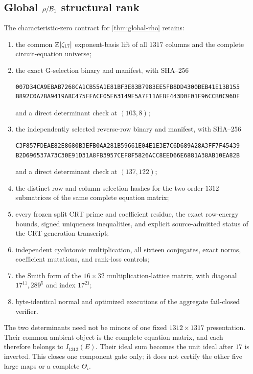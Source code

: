 \subsection{Global \texorpdfstring{\(\rho/\mathcal B_1\)}{rho/B1} structural rank}

The characteristic-zero contract for \cref{thm:global-rho} retains:
\begin{enumerate}
  \item the common \(\mathbb Z[\zeta_{17}]\) exponent-basis lift of all
  \(1317\) columns and the complete circuit-equation universe;
  \item the exact G-selection binary and manifest, with SHA--256
  \begin{verbatim}
007D34CA9EBAB7268CA1CB55A1E81BF3E83B7983EE5FB8DD4300BEB41E13B155
B892C0A7BA9419A8C475FFACF05E63149E5A7F11AEBF443D0F01E96CCB0C96DF
  \end{verbatim}
  and a direct determinant check at \((103,8)\);
  \item the independently selected reverse-row binary and manifest, with
  SHA--256
  \begin{verbatim}
C3F857FDEAE82E8680B3EFB0AA281B59661E04E1E3E7C6D689A28A3FF7F45439
B2D696537A73C30E91D31A8FB3957CEF8F5826ACC8EED66E6881A38AB10EA82B
  \end{verbatim}
  and a direct determinant check at \((137,122)\);
  \item the distinct row and column selection hashes for the two
  order-\(1312\) submatrices of the same complete equation matrix;
  \item every frozen split CRT prime and coefficient residue, the exact
  row-energy bounds, signed uniqueness inequalities, and explicit
  source-admitted status of the CRT generation transcript;
  \item independent cyclotomic multiplication, all sixteen conjugates,
  exact norms, coefficient mutations, and rank-loss controls;
  \item the Smith form of the \(16\times32\) multiplication-lattice
  matrix, with diagonal \(17^{11},289^5\) and index \(17^{21}\);
  \item byte-identical normal and optimized executions of the aggregate
  fail-closed verifier.
\end{enumerate}

The two determinants need not be minors of one fixed \(1312\times1317\)
presentation.  Their common ambient object is the complete equation
matrix, and each therefore belongs to \(I_{1312}(E)\).  Their ideal sum
becomes the unit ideal after \(17\) is inverted.  This closes one
component gate only; it does not certify the other five large maps or a
complete \(\Theta_i\).
